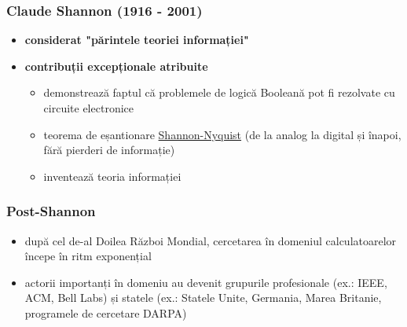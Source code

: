 \documentclass[a4paper,10pt]{article}
\begin{document}
\begin{multicols}{2}
\subsubsection{Claude Shannon (1916 - 2001)}
\begin{itemize}
    \item \textbf{considerat "părintele teoriei informației"}
    \item \textbf{contribuții excepționale atribuite}
    \begin{itemize}
        \item demonstrează faptul că problemele de logică Booleană pot fi rezolvate cu circuite electronice
        \item teorema de eșantionare \href{https://en.wikipedia.org/wiki/Nyquist–Shannon_sampling_theorem}{Shannon-Nyquist} (de la analog la digital și înapoi, fără pierderi de informație)
        \item inventează teoria informației
    \end{itemize}
\end{itemize}
\subsubsection{Post-Shannon}
\begin{itemize}
    \item după cel de-al Doilea Război Mondial, cercetarea în domeniul calculatoarelor începe în ritm exponențial
    \item actorii importanți în domeniu au devenit grupurile profesionale (ex.: IEEE, ACM, Bell Labs) și statele (ex.: Statele Unite, Germania, Marea Britanie, programele de cercetare DARPA)
\end{itemize}

\end{multicols}
\end{document}

